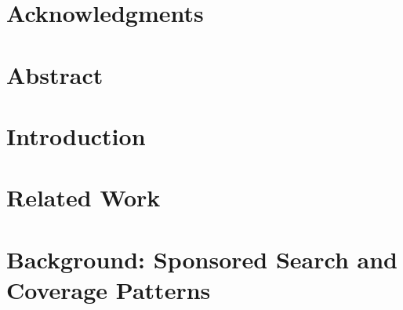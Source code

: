 \documentclass[11pt]{book}
\renewcommand{\baselinestretch}{1.2}
\begin{document}





\newpage
\thispagestyle{empty}
\renewcommand{\thesisdedication}{{\large Copyright \copyright~~Amar Budhiraja, 2017\\}{\large All Rights Reserved\\}}
\thesisdedicationpage


\newpage
\thispagestyle{empty}
\renewcommand{\thesisdedication}{\large To my family}
\thesisdedicationpage

\mastersthesis
\renewcommand{\baselinestretch}{1.5}

\chapter*{Acknowledgments}
\label{ch:ack}


\chapter*{Abstract}
\label{ch:abstract}


\tableofcontents
\listoffigures
\listoftables

\chapter{Introduction}
\label{ch:introduction}



\chapter{Related Work}
\label{ch:relatedwork}



\chapter{Background: Sponsored Search and Coverage Patterns}
\label{ch:background}


\end{document}
